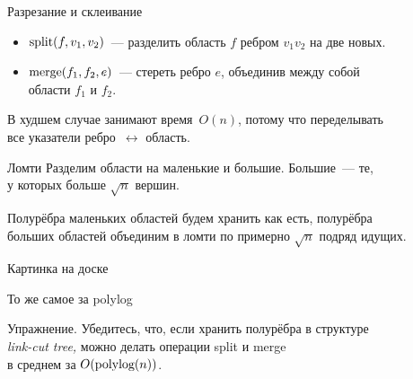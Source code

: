 \begin{frame}{Разрезание и склеивание}
\begin{itemize}
	\item \(\operatorname{split} (f,v_1,v_2)\)~— разделить область \(f\) ребром \(v_1v_2\) на две новых.
	\item \(\operatorname{merge} (f_1,f_2,e)\)~— стереть ребро \(e\), объединив между собой \\
	   области \(f_1\) и \(f_2\).
\end{itemize}
\begin{center}  \end{center} \vspace{-3mm}

	В худшем случае занимают время~\(O(n)\), потому что переделывать \\
	все указатели ребро~\(\leftrightarrow\) область.
\end{frame}

\begin{frame}{Ломти}
	Разделим области на \alert{маленькие} и \alert{большие}. Большие~— те,\\
	у которых больше \(\sqrt{n}\) вершин.

	Полурёбра маленьких областей будем хранить как есть, полурёбра\\
	больших областей объединим в \alert{ломти} по примерно \(\sqrt{n}\) подряд идущих. \bigskip

	{\footnotesize \textcolor{white!46!dgray}{Картинка на доске}}
\end{frame}

\begin{frame}{То же самое за polylog}
\begin{block}{Упражнение.}
	Убедитесь, что, если хранить полурёбра в структуре\\
	{\it link-cut tree,} можно делать операции split и merge\\
	в среднем за \(O\lr*{\text{polylog}\lr*{n}}\).
\end{block}
\end{frame}
